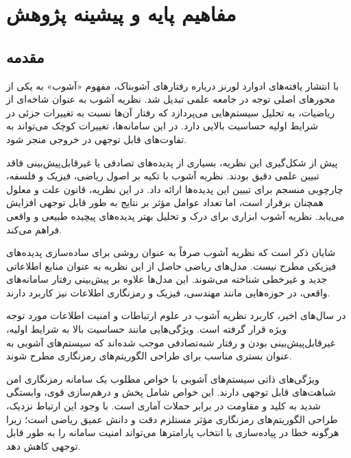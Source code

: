 
\chapter{مفاهیم پایه و پیشینه پژوهش}

\section{مقدمه}
با انتشار یافته‌های ادوارد لورنز درباره رفتارهای آشوبناک، مفهوم «آشوب» به یکی از محورهای اصلی توجه در جامعه علمی تبدیل شد. نظریه آشوب به عنوان شاخه‌ای از ریاضیات، به تحلیل سیستم‌هایی می‌پردازد که رفتار آن‌ها نسبت به تغییرات جزئی در شرایط اولیه حساسیت بالایی دارد. در این سامانه‌ها، تغییرات کوچک می‌تواند به تفاوت‌های قابل توجهی در خروجی منجر شود.

پیش از شکل‌گیری این نظریه، بسیاری از پدیده‌های تصادفی یا غیرقابل‌پیش‌بینی فاقد تبیین علمی دقیق بودند. نظریه آشوب با تکیه بر اصول ریاضی، فیزیک و فلسفه، چارچوبی منسجم برای تبیین این پدیده‌ها ارائه داد. در این نظریه، قانون علت و معلول همچنان برقرار است، اما تعداد عوامل مؤثر بر نتایج به طور قابل توجهی افزایش می‌یابد. نظریه آشوب ابزاری برای درک و تحلیل بهتر پدیده‌های پیچیده طبیعی و واقعی فراهم می‌کند.

شایان ذکر است که نظریه آشوب صرفاً به عنوان روشی برای ساده‌سازی پدیده‌های فیزیکی مطرح نیست. مدل‌های ریاضی حاصل از این نظریه به عنوان منابع اطلاعاتی جدید و غیرخطی شناخته می‌شوند. این مدل‌ها علاوه بر پیش‌بینی رفتار سامانه‌های واقعی، در حوزه‌هایی مانند مهندسی، فیزیک و رمزنگاری اطلاعات نیز کاربرد دارند.

در سال‌های اخیر، کاربرد نظریه آشوب در علوم ارتباطات و امنیت اطلاعات مورد توجه ویژه قرار گرفته است. ویژگی‌هایی مانند حساسیت بالا به شرایط اولیه، غیرقابل‌پیش‌بینی بودن و رفتار شبه‌تصادفی موجب شده‌اند که سیستم‌های آشوبی به عنوان بستری مناسب برای طراحی الگوریتم‌های رمزنگاری مطرح شوند.

ویژگی‌های ذاتی سیستم‌های آشوبی با خواص مطلوب یک سامانه رمزنگاری امن شباهت‌های قابل توجهی دارند. این خواص شامل پخش و درهم‌سازی قوی، وابستگی شدید به کلید و مقاومت در برابر حملات آماری است. با وجود این ارتباط نزدیک، طراحی الگوریتم‌های رمزنگاری مؤثر مستلزم دقت و دانش عمیق ریاضی است؛ زیرا هرگونه خطا در پیاده‌سازی یا انتخاب پارامترها می‌تواند امنیت سامانه را به طور قابل توجهی کاهش دهد.

